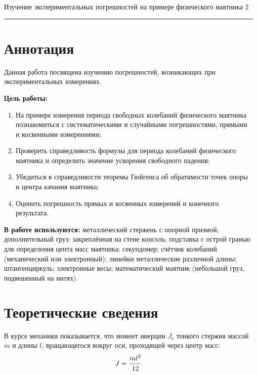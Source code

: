 \documentclass[12pt,a4paper]{scrartcl}
\begin{document}
	
	\begin{flushleft}
		\footnotesize{Изучение экспериментальных погрешностей на примере физического маятника} \hspace{\fill} \footnotesize{2}
		\\[-0.3cm]\noindent\rule{\textwidth}{0.3pt}
	\end{flushleft}

	\section{Аннотация}
	
	Данная работа посвящена изучению погрешностей, возникающих при экспериментальных измерениях.
	
	\textbf{Цель работы:}
	\begin{enumerate}
		\item  На примере измерения периода свободных колебаний физического
		маятника познакомиться с систематическими и случайными погрешностями, прямыми и косвенными измерениями;
		\item Проверить справедливость формулы для периода колебаний физического маятника и определить значение ускорения свободного падения;
		\item Убедиться в справедливости теоремы Гюйгенса об обратимости
		точек опоры и центра качания маятника;
		\item Оценить погрешность прямых и косвенных измерений и конечного результата.
	\end{enumerate}

	\textbf{В работе используются:} металлический стержень с опорной призмой; дополнительный груз; закреплённая на стене консоль; подставка с острой гранью для определения цента масс маятника; секундомер; счётчик колебаний (механический или
	электронный); линейки металлические различной длины; штангенциркуль; электронные весы; математический маятник (небольшой груз, подвешенный на нитях). 

	\section{Теоретические сведения}
	В курсе механики показывается, что момент инерции $J_{\text{с}}$ тонкого стержня массой $m$ и длины $l$, вращающегося вокруг оси, проходящей через центр масс:
	\begin{equation}
		J = \dfrac{\strut ml^2}{\strut 12}
	\end{equation}
\end{document}
